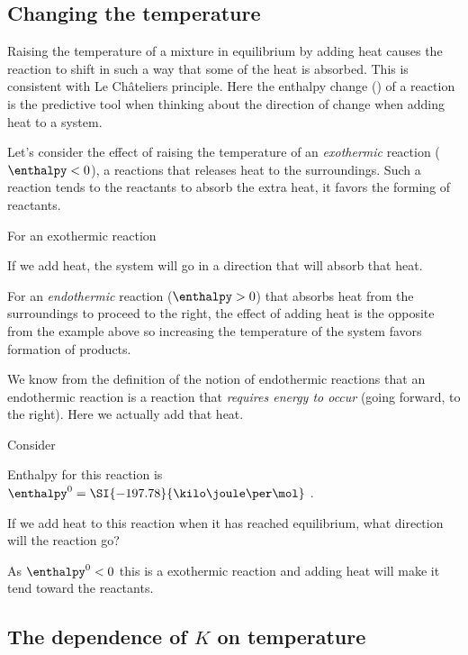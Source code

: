 \documentclass[../mit-general-chemistry.tex]{subfiles}
\begin{document}
\subsection{Changing the temperature}


Raising the temperature of a mixture in equilibrium by adding heat
causes the reaction to shift in such a way that some of the heat is
absorbed. This is consistent with Le Châteliers principle. Here the
enthalpy change (\enthalpy) of a reaction is the predictive tool when
thinking about the direction of change when adding heat to a system.



Let's consider the effect of raising the temperature of an {\em
  exothermic} reaction ($\enthalpy < 0$), a reactions that releases
heat to the surroundings. Such a reaction tends to the reactants to
absorb the extra heat, it favors the forming of reactants.

For an exothermic reaction


If we add heat, the system will go in a direction that will absorb
that heat.

For an {\em endothermic} reaction ($\enthalpy > 0$) that absorbs heat
from the surroundings to proceed to the right, the effect of
adding heat is the opposite from the example above
so increasing the temperature of the system favors formation of
products.

We know from the definition of the notion of endothermic reactions
that an endothermic reaction is a reaction that {\em requires energy
  to occur} (going forward, to the right). Here we actually add that
heat.




\begin{example}
  Consider

  Enthalpy for this reaction is $\enthalpy^0 =
  \SI{-197.78}{\kilo\joule\per\mol}$ .

  If we add heat to this reaction when it has reached equilibrium,
  what direction will the reaction go?

  As $\enthalpy^0 < 0$ this is a exothermic reaction and adding heat
  will make it tend toward the reactants.
\end{example}




\subsection{The dependence of $K$ on temperature}
\end{document}
